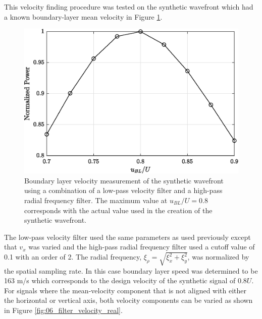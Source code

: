 This velocity finding procedure was tested on the synthetic wavefront which had a known boundary-layer mean velocity in Figure \ref{fig:06_filter_velocity_measure}.
\begin{figure}
 \centering
 \includegraphics{../matlab/06_single_sensor_filtering/filter_velocity_measure.eps}
 \caption{Boundary layer velocity measurement of the synthetic wavefront using a combination of a low-pass velocity filter and a high-pass radial frequency filter. The maximum value at $u_{BL}/U=0.8$ corresponds with the actual value used in the creation of the synthetic wavefront.}
 \label{fig:06_filter_velocity_measure}
\end{figure}
The low-pass velocity filter used the same parameters as used previously except that $v_x$ was varied and the high-pass radial frequency filter used a cutoff value of 0.1 with an order of 2.
The radial frequency, $\xi_\rho=\sqrt{\xi_x^2+\xi_y^2}$, was normalized by the spatial sampling rate.
In this case boundary layer speed was determined to be 163 m/s which corresponds to the design velocity of the synthetic signal of $0.8U$.
For signals where the mean-velocity component that is not aligned with either the horizontal or vertical axis, both velocity components can be varied as shown in Figure \ref{fig:06_filter_velocity_real}.

